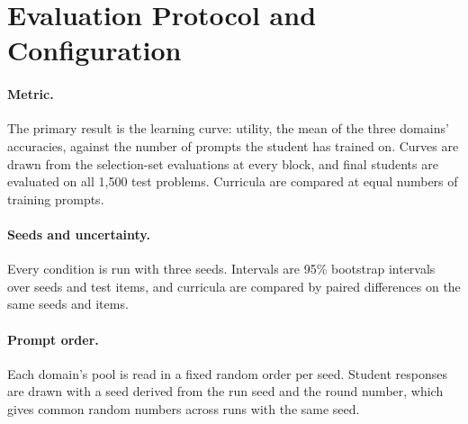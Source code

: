 \section{Evaluation Protocol and Configuration}
\label{imp:sec:protocol}
\label{imp:sec:config}

\paragraph{Metric.} The primary result is the learning curve: utility, the mean of the
three domains' accuracies, against the number of prompts the student has trained on.
Curves are drawn from the selection-set evaluations at every block, and final students
are evaluated on all 1,500 test problems. Curricula are compared at equal numbers of
training prompts.

\paragraph{Seeds and uncertainty.} Every condition is run with three seeds. Intervals
are 95\% bootstrap intervals over seeds and test items, and curricula are compared by
paired differences on the same seeds and items.

\paragraph{Prompt order.} Each domain's pool is read in a fixed random order per seed.
Student responses are drawn with a seed derived from the run seed and the round number,
which gives common random numbers across runs with the same seed.

